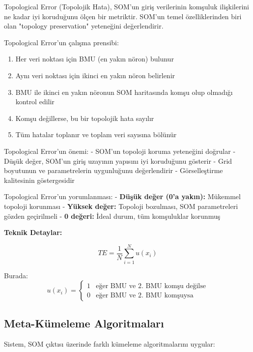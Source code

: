 Topological Error (Topolojik Hata), SOM'un giriş verilerinin komşuluk ilişkilerini ne kadar iyi koruduğunu ölçen bir metriktir. SOM'un temel özelliklerinden biri olan "topology preservation" yeteneğini değerlendirir.

Topological Error'un çalışma prensibi:
\begin{enumerate}
    \item Her veri noktası için BMU (en yakın nöron) bulunur
    \item Aynı veri noktası için ikinci en yakın nöron belirlenir
    \item BMU ile ikinci en yakın nöronun SOM haritasında komşu olup olmadığı kontrol edilir
    \item Komşu değillerse, bu bir topolojik hata sayılır
    \item Tüm hatalar toplanır ve toplam veri sayısına bölünür
\end{enumerate}

Topological Error'un önemi:
- SOM'un topoloji koruma yeteneğini doğrular
- Düşük değer, SOM'un giriş uzayının yapısını iyi koruduğunu gösterir
- Grid boyutunun ve parametrelerin uygunluğunu değerlendirir
- Görselleştirme kalitesinin göstergesidir

Topological Error'un yorumlanması:
- \textbf{Düşük değer (0'a yakın):} Mükemmel topoloji korunması
- \textbf{Yüksek değer:} Topoloji bozulması, SOM parametreleri gözden geçirilmeli
- \textbf{0 değeri:} İdeal durum, tüm komşuluklar korunmuş

\textbf{Teknik Detaylar:}

\begin{equation}
TE = \frac{1}{N} \sum_{i=1}^{N} u(x_i)
\label{eq:topological_error}
\end{equation}

Burada:
\begin{equation}
u(x_i) = \begin{cases}
1 & \text{eğer BMU ve 2. BMU komşu değilse} \\
0 & \text{eğer BMU ve 2. BMU komşuysa}
\end{cases}
\label{eq:topological_error_function}
\end{equation}

\newpage

\subsection{Meta-Kümeleme Algoritmaları}

Sistem, SOM çıktısı üzerinde farklı kümeleme algoritmalarını uygular:

